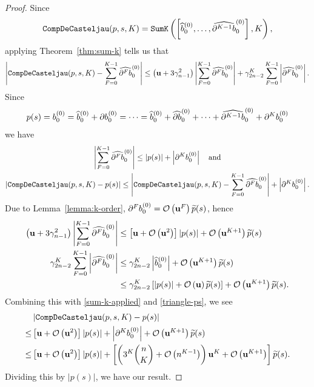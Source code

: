 \documentclass[3p, authoryear, square]{elsarticle}
\theoremstyle{definition}
\newcommand{\bigO}[1]{\mathcal{O}\left(#1\right)}
\newcommand{\mach}{\mathbf{u}}
\newcommand{\db}[1]{
  \ifthenelse{\equal{#1}{1}}
             {\partial b}
             {\partial^{#1} b}
}
\newcommand{\cdb}[1]{
  \ifthenelse{\equal{#1}{1}}
             {\widehat{\partial b}}
             {\widehat{\partial^{#1} b}}
}
\begin{document}
\begin{proof}
Since
\begin{equation}
\mathtt{CompDeCasteljau}(p, s, K) = \mathtt{SumK}\left(\left[
  \widehat{b}_0^{(0)}, \ldots, \cdb{K - 1}_0^{(0)}\right], K\right),
\end{equation}
applying Theorem~\ref{thm:sum-k} tells us that
\begin{equation}\label{sum-k-applied}
\left|\mathtt{CompDeCasteljau}(p, s, K) - \sum_{F = 0}^{K - 1}
\cdb{F}_0^{(0)}\right| \leq
\left(\mach + 3 \gamma_{n - 1}^2\right) \left|\sum_{F = 0}^{K - 1}
\cdb{F}_0^{(0)}\right| +
\gamma_{2n - 2}^K \sum_{F = 0}^{K - 1} \left|\cdb{F}_0^{(0)}\right|.
\end{equation}
Since
\begin{equation}
p(s) = b_0^{(0)} = \widehat{b}_0^{(0)} + \db{1}_0^{(0)}
= \cdots
= \widehat{b}_0^{(0)} + \cdb{1}_0^{(0)} + \cdots
+ \cdb{K - 1}_0^{(0)} + \db{K}_0^{(0)}
\end{equation}
we have
\begin{gather}
\left|\sum_{F = 0}^{K - 1} \cdb{F}_0^{(0)}\right|
\leq \left|p(s)\right| + \left|\db{K}_0^{(0)}\right| \quad \text{and} \\
\left|\mathtt{CompDeCasteljau}(p, s, K) - p(s)\right| \leq
\left|\mathtt{CompDeCasteljau}(p, s, K) - \sum_{F = 0}^{K - 1}
\cdb{F}_0^{(0)}\right| +
\left|\db{K}_0^{(0)}\right| \label{triangle-ps}.
\end{gather}
Due to Lemma~\ref{lemma:k-order}, \(\db{F}_0^{(0)} =
\bigO{\mach^F} \widetilde{p}(s)\), hence
\begin{align}
\left(\mach + 3 \gamma_{n - 1}^2\right) \left|\sum_{F = 0}^{K - 1}
\cdb{F}_0^{(0)}\right| &\leq
\left[\mach + \bigO{\mach^2}\right] \left|p(s)\right| +
\bigO{\mach^{K + 1}} \widetilde{p}(s) \\
\gamma_{2n - 2}^K \sum_{F = 0}^{K - 1} \left|\cdb{F}_0^{(0)}\right| &\leq
\gamma_{2n - 2}^K \left|\widehat{b}_0^{(0)}\right| +
\bigO{\mach^{K + 1}} \widetilde{p}(s) \\
&\leq
\gamma_{2n - 2}^K \left[\left|p(s)\right| +
  \bigO{\mach} \widetilde{p}(s)\right] +
\bigO{\mach^{K + 1}} \widetilde{p}(s).
\end{align}
Combining this with \eqref{sum-k-applied} and \eqref{triangle-ps}, we
see
\begin{align}
& \left|\mathtt{CompDeCasteljau}(p, s, K) - p(s)\right| \\
\leq &
\left[\mach + \bigO{\mach^2}\right] \left|p(s)\right| +
\left|\db{K}_0^{(0)}\right| +
\bigO{\mach^{K + 1}} \widetilde{p}(s) \\
\leq &
\left[\mach + \bigO{\mach^2}\right] \left|p(s)\right| +
\left[\left(3^{K} \binom{n}{K} + \bigO{n^{K - 1}}\right) \mach^K +
\bigO{\mach^{K + 1}} \right]
\widetilde{p}(s).
\end{align}
Dividing this by \(\left|p(s)\right|\), we have our result.
\end{proof}
\end{document}
